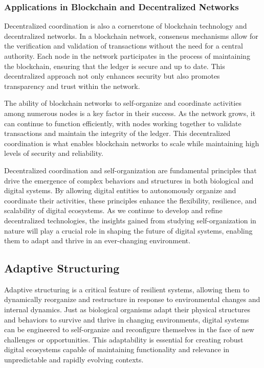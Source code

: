 \documentclass[12pt,twoside]{article}
\begin{document}
\subsubsection{Applications in Blockchain and Decentralized Networks}

Decentralized coordination is also a cornerstone of blockchain technology and decentralized networks. In a blockchain network, consensus mechanisms allow for the verification and validation of transactions without the need for a central authority. Each node in the network participates in the process of maintaining the blockchain, ensuring that the ledger is secure and up to date. This decentralized approach not only enhances security but also promotes transparency and trust within the network.

The ability of blockchain networks to self-organize and coordinate activities among numerous nodes is a key factor in their success. As the network grows, it can continue to function efficiently, with nodes working together to validate transactions and maintain the integrity of the ledger. This decentralized coordination is what enables blockchain networks to scale while maintaining high levels of security and reliability.

Decentralized coordination and self-organization are fundamental principles that drive the emergence of complex behaviors and structures in both biological and digital systems. By allowing digital entities to autonomously organize and coordinate their activities, these principles enhance the flexibility, resilience, and scalability of digital ecosystems. As we continue to develop and refine decentralized technologies, the insights gained from studying self-organization in nature will play a crucial role in shaping the future of digital systems, enabling them to adapt and thrive in an ever-changing environment.

\subsection{Adaptive Structuring}
Adaptive structuring is a critical feature of resilient systems, allowing them to dynamically reorganize and restructure in response to environmental changes and internal dynamics. Just as biological organisms adapt their physical structures and behaviors to survive and thrive in changing environments, digital systems can be engineered to self-organize and reconfigure themselves in the face of new challenges or opportunities. This adaptability is essential for creating robust digital ecosystems capable of maintaining functionality and relevance in unpredictable and rapidly evolving contexts.
\end{document}
